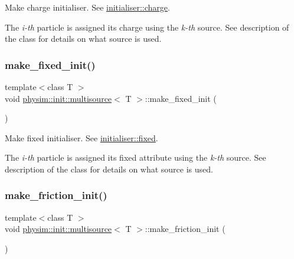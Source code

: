 Make charge initialiser. See \hyperlink{classphysim_1_1init_1_1initialiser_ac9ff9d82f6a1effdaf44cfacd92669d6}{initialiser\+::charge}. 

The {\itshape i-\/th} particle is assigned its charge using the {\itshape k-\/th} source. See description of the class for details on what source is used. \mbox{\label{classphysim_1_1init_1_1multisource_a76a07d9c40c1b816efa0a20285f3c46f}} 
\subsubsection{\texorpdfstring{make\+\_\+fixed\+\_\+init()}{make\_fixed\_init()}}
{\footnotesize\ttfamily template$<$class T $>$ \\
void \hyperlink{classphysim_1_1init_1_1multisource}{physim\+::init\+::multisource}$<$ T $>$\+::make\+\_\+fixed\+\_\+init (\begin{DoxyParamCaption}{ }\end{DoxyParamCaption})}



Make fixed initialiser. See \hyperlink{classphysim_1_1init_1_1initialiser_a0deb0d7e29b824274c4cd81306b42465}{initialiser\+::fixed}. 

The {\itshape i-\/th} particle is assigned its \textquotesingle{}fixed\textquotesingle{} attribute using the {\itshape k-\/th} source. See description of the class for details on what source is used. \mbox{\label{classphysim_1_1init_1_1multisource_a18db2f8c43641a9ec243ba0a4693f679}} 
\subsubsection{\texorpdfstring{make\+\_\+friction\+\_\+init()}{make\_friction\_init()}}
{\footnotesize\ttfamily template$<$class T $>$ \\
void \hyperlink{classphysim_1_1init_1_1multisource}{physim\+::init\+::multisource}$<$ T $>$\+::make\+\_\+friction\+\_\+init (\begin{DoxyParamCaption}{ }\end{DoxyParamCaption})}



